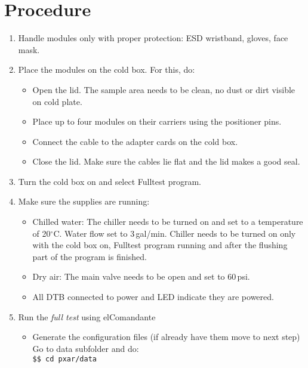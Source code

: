 \documentclass[12pt]{unlsilabsop}
\begin{document}
\section{Procedure}

\begin{enumerate}
    \item Handle modules only with proper protection: ESD wristband, gloves, face mask.
    \item Place the modules on the cold box. For this, do:
    \begin{itemize}
        \item Open the lid. The sample area needs to be clean, no dust or dirt visible on cold plate.
        \item Place up to four modules on their carriers using the positioner pins.
        \item Connect the cable to the adapter cards on the cold box.
        \item Close the lid. Make sure the cables lie flat and the lid makes a good seal.
    \end{itemize}    
    \item Turn the cold box on and select Fulltest program. %
    \item Make sure the supplies are running:
     \begin{itemize}
        \item Chilled water: The chiller needs to be turned on and set to a temperature of 20$^\circ$C. Water flow set to 3\,gal/min. Chiller needs to be turned on only with the cold box on, Fulltest program running and after the flushing part of the program is finished.
        \item Dry air: The main valve needs to be open and set to 60\,psi.
        \item All DTB connected to power and LED indicate they are powered.
    \end{itemize}
    \item Run the \emph{full test} using elComandante 
    \begin{itemize}
		\item Generate the configuration files (if already have them move to next step)\\
		Go to data subfolder and do:\\
		\texttt{\$\$ cd pxar/data}\\

\end{itemize}
\end{enumerate}
\end{document}
